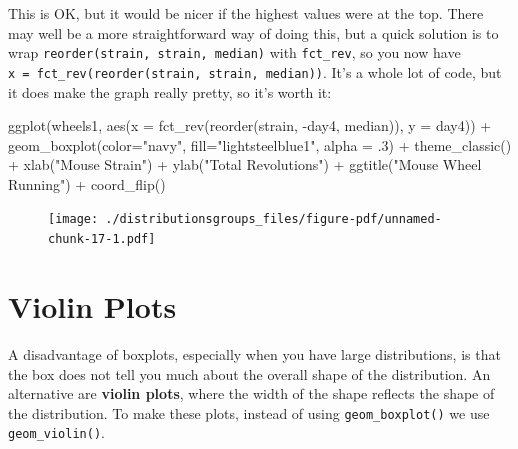 \documentclass[
  letterpaper,
  DIV=11,
  numbers=noendperiod]{scrreprt}
\newenvironment{Shaded}{\begin{snugshade}}{\end{snugshade}}
\newcommand{\AttributeTok}[1]{\textcolor[rgb]{0.40,0.45,0.13}{#1}}
\newcommand{\DecValTok}[1]{\textcolor[rgb]{0.68,0.00,0.00}{#1}}
\newcommand{\FunctionTok}[1]{\textcolor[rgb]{0.28,0.35,0.67}{#1}}
\newcommand{\NormalTok}[1]{\textcolor[rgb]{0.00,0.23,0.31}{#1}}
\newcommand{\SpecialCharTok}[1]{\textcolor[rgb]{0.37,0.37,0.37}{#1}}
\newcommand{\StringTok}[1]{\textcolor[rgb]{0.13,0.47,0.30}{#1}}
\begin{document}
This is OK, but it would be nicer if the highest values were at the top.
There may well be a more straightforward way of doing this, but a quick
solution is to wrap \texttt{reorder(strain,\ strain,\ median)} with
\texttt{fct\_rev}, so you now have
\texttt{x\ =\ fct\_rev(reorder(strain,\ strain,\ median))}. It's a whole
lot of code, but it does make the graph really pretty, so it's worth it:

\begin{Shaded}
\begin{Highlighting}[]
\FunctionTok{ggplot}\NormalTok{(wheels1, }\FunctionTok{aes}\NormalTok{(}\AttributeTok{x =} \FunctionTok{fct\_rev}\NormalTok{(}\FunctionTok{reorder}\NormalTok{(strain, }\SpecialCharTok{{-}}\NormalTok{day4, median)), }\AttributeTok{y =}\NormalTok{ day4)) }\SpecialCharTok{+} 
  \FunctionTok{geom\_boxplot}\NormalTok{(}\AttributeTok{color=}\StringTok{"navy"}\NormalTok{, }\AttributeTok{fill=}\StringTok{"lightsteelblue1"}\NormalTok{, }\AttributeTok{alpha =}\NormalTok{ .}\DecValTok{3}\NormalTok{) }\SpecialCharTok{+}
  \FunctionTok{theme\_classic}\NormalTok{() }\SpecialCharTok{+}
  \FunctionTok{xlab}\NormalTok{(}\StringTok{"Mouse Strain"}\NormalTok{) }\SpecialCharTok{+}
  \FunctionTok{ylab}\NormalTok{(}\StringTok{"Total Revolutions"}\NormalTok{) }\SpecialCharTok{+}
  \FunctionTok{ggtitle}\NormalTok{(}\StringTok{"Mouse Wheel Running"}\NormalTok{) }\SpecialCharTok{+}
  \FunctionTok{coord\_flip}\NormalTok{() }
\end{Highlighting}
\end{Shaded}

\begin{figure}[H]

{\centering \texttt{[image: ./distributionsgroups\_files/figure-pdf/unnamed-chunk-17-1.pdf]}

}

\end{figure}

\hypertarget{violin-plots}{%
\section{Violin Plots}\label{violin-plots}}

A disadvantage of boxplots, especially when you have large
distributions, is that the box does not tell you much about the overall
shape of the distribution. An alternative are \textbf{violin plots},
where the width of the shape reflects the shape of the distribution. To
make these plots, instead of using \texttt{geom\_boxplot()} we use
\texttt{geom\_violin()}.
\end{document}
